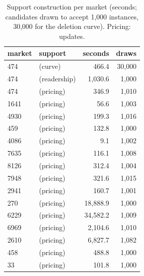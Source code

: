 
\begin{table}[tbp]
  \centering
  \footnotesize
  \caption{Support construction per \sqlshare{} market (seconds; candidates drawn to accept 1,000 instances, 30,000 for the deletion curve). Pricing: \qirana{} updates.}
  \label{tab:app-costs}
  \begin{tabular}{@{}llrr@{}}
    \toprule
    market & support & seconds & draws \\
    \midrule
    474 & (curve) & 466.4 & 30,000 \\
    474 & (readership) & 1,030.6 & 1,000 \\
    474 & (pricing) & 346.9 & 1,010 \\
    1641 & (pricing) & 56.6 & 1,003 \\
    4930 & (pricing) & 199.3 & 1,016 \\
    459 & (pricing) & 132.8 & 1,000 \\
    4086 & (pricing) & 9.1 & 1,002 \\
    7635 & (pricing) & 116.1 & 1,008 \\
    8126 & (pricing) & 312.4 & 1,004 \\
    7948 & (pricing) & 321.6 & 1,015 \\
    2941 & (pricing) & 160.7 & 1,001 \\
    270 & (pricing) & 18,888.9 & 1,000 \\
    6229 & (pricing) & 34,582.2 & 1,009 \\
    6969 & (pricing) & 2,104.6 & 1,010 \\
    2610 & (pricing) & 6,827.7 & 1,082 \\
    458 & (pricing) & 488.8 & 1,000 \\
    33 & (pricing) & 101.8 & 1,000 \\
    \bottomrule
  \end{tabular}
\end{table}
